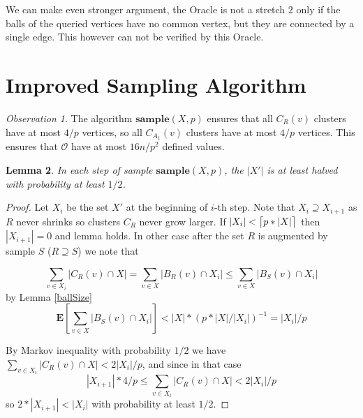 \documentclass[shortabstract, lic, english]{iithesis}
\theoremstyle{definition} \newtheorem{definition}{Definition}[chapter]
\theoremstyle{remark} \newtheorem{remark}[definition]{Observation}
\theoremstyle{plain} \newtheorem{theorem}[definition]{Theorem}
\theoremstyle{plain} \newtheorem{lemma}[definition]{Lemma}
\theoremstyle{plain} \newtheorem{conjecture}[definition]{Conjecture}
\DeclarePairedDelimiter{\ceil}{\lceil}{\rceil}
\begin{document}
We can make even stronger argument, the Oracle is not a stretch $2$ only if the balls of the queried vertices have no common vertex, but they are connected by a single edge.
This however can not be verified by this Oracle.


\section{Improved Sampling Algorithm}

\noindent{}

\begin{remark} \label{clusterSize}
The algorithm $\mathbf{sample}(X, p)$ ensures that all $C_R(v)$ clusters have at most $4/p$ vertices, so all $C_{A_1}(v)$ clusters have at most $4/p$ vertices.
This ensures that $\mathcal{O}$ have at most $16n/p^2$ defined values.
\end{remark}

\begin{lemma}
    In each step of sample $\mathbf{sample}(X, p)$, the $|X'|$ is at least halved with probability at least $1/2$.
\end{lemma}

\begin{proof}
    Let $X_i$ be the set $X'$ at the beginning of $i$-th step. Note that $X_i \supseteq X_{i+1}$ as $R$ never shrinks so clusters $C_R$ never grow larger.
    If $|X_i| < \ceil[\big]{p * |X|}$ then $|X_{i+1}| = 0$ and lemma holds.
    In other case after the set $R$ is augmented by sample $S$ ($R \supseteq S$) we note that
    

    $$\sum_{v \in X_i} |C_R(v) \cap X| = \sum_{v \in X} |B_R(v) \cap X_i| \leq \sum_{v \in X} |B_S(v) \cap X_i| $$
    by Lemma \ref{ballSize}
    $$\mathbf{E}[\sum_{v \in X} |B_S(v) \cap X_i|] < |X| * (p * |X|/|X_i|)^{-1} = |X_i|/p$$

    By Markov inequality with probability $1/2$ we have $\sum_{v \in X_i} |C_R(v) \cap X| < 2|X_i|/p$,
    and since in that case 
    $$|X_{i+1}| * 4/p \leq \sum_{v \in X_i} |C_R(v) \cap X| < 2|X_i|/p$$
    so $2 * |X_{i+1}| < |X_i|$ with probability at least $1/2$.

\end{proof}
\end{document}
